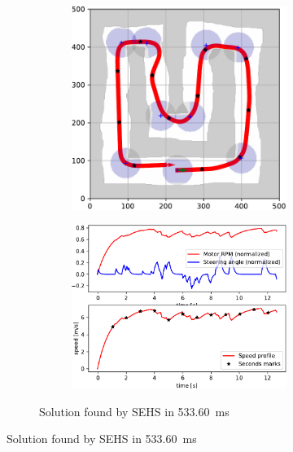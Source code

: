 \begin{figure}[!tbp]
	\vspace{0.75cm}

	\begin{subfigure}[t]{\textwidth}
		\begin{subfigure}[t]{0.45\textwidth}
			\includegraphics[width=\textwidth]{../img/experiments/u-sehs-trajectory}
		\end{subfigure}
		\hfill
		\begin{subfigure}[t]{0.45\textwidth}
			\includegraphics[width=\textwidth]{../img/experiments/u-sehs-actuators}
		\end{subfigure}
		\caption{Solution found by SEHS in \SI{533.60}{\milli\second}}
		\label{fig:u-sehs}
	\end{subfigure}
	

\end{figure}
